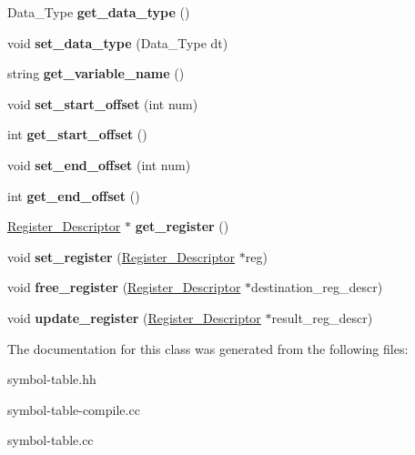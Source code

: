 \begin{DoxyCompactItemize}
\item 
\mbox{\label{classSymbol__Table__Entry_a36d25d7be616f05f438c065047e439f6}} 
Data\+\_\+\+Type {\bfseries get\+\_\+data\+\_\+type} ()
\item 
\mbox{\label{classSymbol__Table__Entry_a67a32ea30fbb43c74876b35f65f467c8}} 
void {\bfseries set\+\_\+data\+\_\+type} (Data\+\_\+\+Type dt)
\item 
\mbox{\label{classSymbol__Table__Entry_a183b23e22a1d688d16816d95ec6062d8}} 
string {\bfseries get\+\_\+variable\+\_\+name} ()
\item 
\mbox{\label{classSymbol__Table__Entry_a485a573fa84e51ae1dfcddd6d7415a9d}} 
void {\bfseries set\+\_\+start\+\_\+offset} (int num)
\item 
\mbox{\label{classSymbol__Table__Entry_acef9e4e552a11d318d68a510cc482488}} 
int {\bfseries get\+\_\+start\+\_\+offset} ()
\item 
\mbox{\label{classSymbol__Table__Entry_a048104be72808c4b8ade0d725622bd98}} 
void {\bfseries set\+\_\+end\+\_\+offset} (int num)
\item 
\mbox{\label{classSymbol__Table__Entry_a184bc7e900427e4dd33e55f7128bd907}} 
int {\bfseries get\+\_\+end\+\_\+offset} ()
\item 
\mbox{\label{classSymbol__Table__Entry_ab5fc0368fc8cd9c15062c6e1b2b52327}} 
\hyperlink{classRegister__Descriptor}{Register\+\_\+\+Descriptor} $\ast$ {\bfseries get\+\_\+register} ()
\item 
\mbox{\label{classSymbol__Table__Entry_aebe00e8cf236800b6b770e6b314d8b1a}} 
void {\bfseries set\+\_\+register} (\hyperlink{classRegister__Descriptor}{Register\+\_\+\+Descriptor} $\ast$reg)
\item 
\mbox{\label{classSymbol__Table__Entry_aaf82d041b68599f7823cb18b441ffe41}} 
void {\bfseries free\+\_\+register} (\hyperlink{classRegister__Descriptor}{Register\+\_\+\+Descriptor} $\ast$destination\+\_\+reg\+\_\+descr)
\item 
\mbox{\label{classSymbol__Table__Entry_aeee42ae764e795e38de40cc0cabe27b9}} 
void {\bfseries update\+\_\+register} (\hyperlink{classRegister__Descriptor}{Register\+\_\+\+Descriptor} $\ast$result\+\_\+reg\+\_\+descr)
\end{DoxyCompactItemize}


The documentation for this class was generated from the following files\+:\begin{DoxyCompactItemize}
\item 
symbol-\/table.\+hh\item 
symbol-\/table-\/compile.\+cc\item 
symbol-\/table.\+cc\end{DoxyCompactItemize}
